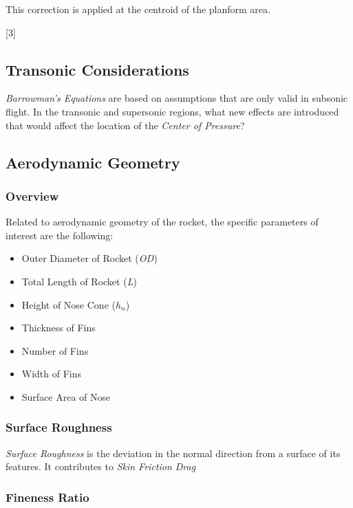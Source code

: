 \documentclass[]{article}
\providecommand{\tightlist}{%
  \setlength{\itemsep}{0pt}\setlength{\parskip}{0pt}}
\begin{document}
This correction is applied at the centroid of the planform area.

{[}3{]}

\subsection{Transonic Considerations}\label{transonic-considerations}

\emph{Barrowman's Equations} are based on assumptions that are only
valid in subsonic flight. In the transonic and supersonic regions, what
new effects are introduced that would affect the location of the
\emph{Center of Pressure}?

\subsection{Aerodynamic Geometry}\label{aerodynamic-geometry}

\subsubsection{Overview}\label{overview-1}

Related to aerodynamic geometry of the rocket, the specific parameters
of interest are the following:

\begin{itemize}
\tightlist
\item
  Outer Diameter of Rocket (\emph{OD})
\item
  Total Length of Rocket (\emph{L})
\item
  Height of Nose Cone (\(h_n\))
\item
  Thickness of Fins
\item
  Number of Fins
\item
  Width of Fins
\item
  Surface Area of Nose
\end{itemize}

\subsubsection{Surface Roughness}\label{surface-roughness}

\emph{Surface Roughness} is the deviation in the normal direction from a
surface of its features. It contributes to \emph{Skin Friction Drag}

\subsubsection{Fineness Ratio}\label{fineness-ratio}
\end{document}
